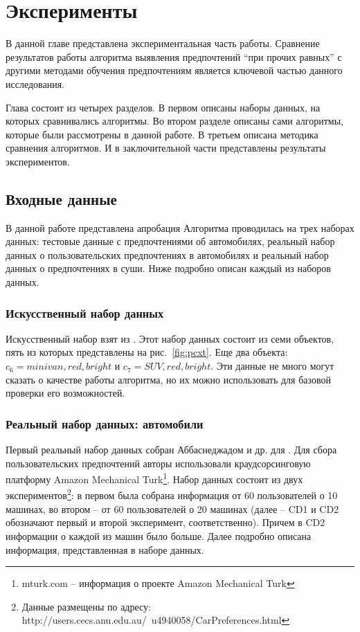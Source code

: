 \chapter{Эксперименты}
\label{chapter:experiments}
В данной главе представлена экспериментальная часть работы. Сравнение результатов работы алгоритма выявления предпочтений \enquote{при прочих равных} с другими методами обучения предпочтениям является ключевой частью данного исследования.

Глава состоит из четырех разделов. В первом описаны наборы данных, на которых сравнивались алгоритмы. Во втором разделе описаны сами алгоритмы, которые были рассмотрены в данной работе. В третьем описана методика сравнения алгоритмов. И в заключительной части представлены результаты экспериментов.

\section{Входные данные}
	В данной работе представлена
	апробация Алгоритма проводилась на трех наборах данных: тестовые данные с предпочтениями об автомобилях, реальный набор данных о пользовательских предпочтениях в автомобилях %
	и реальный набор данных о предпочтениях в суши. Ниже подробно описан каждый из наборов данных.
	
	\subsection{Искусственный набор данных}
		Искусственный набор взят из \cite{Obiedkov:2013}. Этот набор данных состоит из семи объектов, пять из которых представлены на рис.~\ref{fig:pcxt}. Еще два объекта:
		$c_6={minivan, red, bright}$ и $c_7={SUV, red, bright}$. Эти данные не много могут сказать о качестве работы алгоритма, но их можно использовать для базовой проверки его возможностей.
	
	\subsection{Реальный набор данных: автомобили}
		Первый реальный набор данных собран Аббаснеджадом и др. для \cite{dataset:Abbasnejad:2013}. Для сбора пользовательских предпочтений авторы использовали краудсорсинговую платформу Amazon Mechanical Turk\footnote{mturk.com – информация о проекте Amazon Mechanical Turk}. Набор данных состоит из двух экспериментов\footnote{Данные размещены по адресу: http://users.cecs.anu.edu.au/~u4940058/CarPreferences.html}: в первом была собрана информация от 60 пользователей о 10 машинах, во втором – от 60 пользователей о 20 машинах (далее – CD1 и CD2 обозначают первый и второй эксперимент, соответственно). Причем в CD2 информации о каждой из машин было больше. Далее подробно описана информация, представленная в наборе данных.
		
